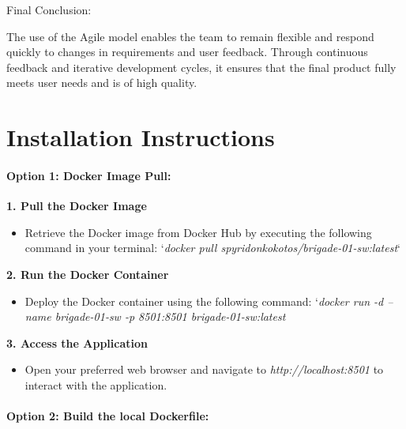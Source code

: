 \documentclass[unnumsec,webpdf,contemporary,large]{oup-authoring-template}%
\theoremstyle{thmstyleone}%
\theoremstyle{thmstyletwo}%
\theoremstyle{thmstylethree}%
\begin{document}
Final Conclusion:
\vspace{0.2cm}

The use of the Agile model enables the team to remain flexible and respond quickly to changes in requirements and user feedback. Through continuous feedback and iterative development cycles, it ensures that the final product fully meets user needs and is of high quality.

\section{Installation Instructions}
\vspace{0.2cm}

\paragraph{\textbf{Option 1}: Docker Image Pull:}
\vspace{0.2cm}

\textbf{1. Pull the Docker Image}
\vspace{0.2cm}

\begin{itemize}
    \item Retrieve the Docker image from Docker Hub by executing the following command in your terminal: `\textit{docker pull spyridonkokotos/brigade-01-sw:latest}`
\end{itemize}
\vspace{0.2cm}

\textbf{2. Run the Docker Container}
\vspace{0.2cm}

\begin{itemize}
    \item Deploy the Docker container using the following command: `\textit{docker run -d --name brigade-01-sw -p 8501:8501 brigade-01-sw:latest}
\end{itemize}
\vspace{0.2cm}

\textbf{3. Access the Application}
\vspace{0.2cm}

\begin{itemize}
    \item Open your preferred web browser and navigate to \textit{http://localhost:8501} to interact with the application.
\end{itemize}
\vspace{0.2cm}

\paragraph{\textbf{Option 2}: Build the local Dockerfile:}
\vspace{0.2cm}
\end{document}
